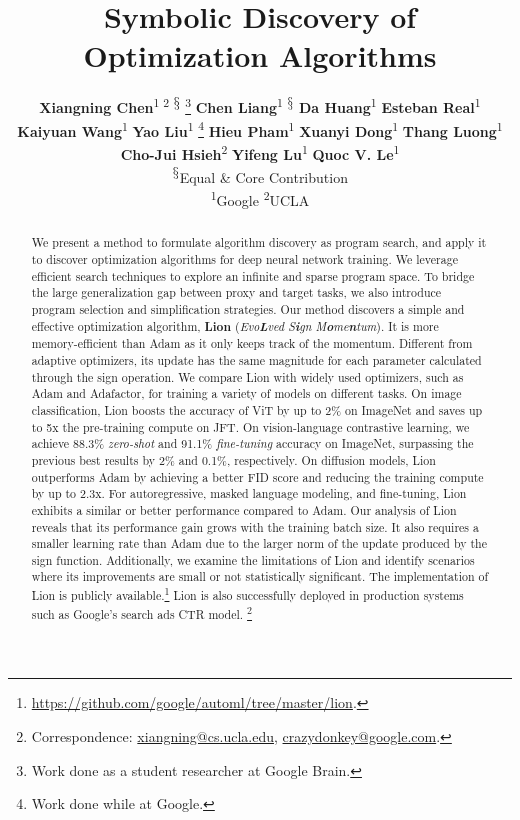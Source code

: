 \documentclass{article}
\title{
\vspace{-25pt}
\textbf{Symbolic Discovery of Optimization Algorithms}
  }
\author{
\normalsize{}
\textbf{Xiangning Chen}\textsuperscript{1 2 $\mathsection$ }\thanks{Work done as a student researcher at Google Brain.}\hspace{8mm}
\textbf{Chen Liang}\textsuperscript{1 $\mathsection$}\hspace{8mm}
\textbf{Da Huang}\textsuperscript{1}\hspace{8mm}
\textbf{Esteban Real}\textsuperscript{1}
\vspace{10pt}
\\
\normalsize{}
\textbf{Kaiyuan Wang}\textsuperscript{1}\hspace{8mm}
\textbf{Yao Liu}\textsuperscript{1 }\thanks{Work done while at Google.}\hspace{8mm}
\textbf{Hieu Pham}\textsuperscript{1}\hspace{8mm}
\textbf{Xuanyi Dong}\textsuperscript{1}\hspace{8mm}
\textbf{Thang Luong}\textsuperscript{1}
\vspace{10pt}
 \\ 
\normalsize{}
\textbf{Cho-Jui Hsieh}\textsuperscript{2}\hspace{8mm}
\textbf{Yifeng Lu}\textsuperscript{1}\hspace{8mm}
\textbf{Quoc V. Le}\textsuperscript{1}
\vspace{20pt}
\\ 
\normalsize{}
\textsuperscript{$\mathsection$}Equal \& Core Contribution
\vspace{20pt}
\\ 
\normalsize{}
\textsuperscript{1}Google\hspace{20mm}
\textsuperscript{2}UCLA
}
\date{}
\newcommand{\name}{Lion}
\newcommand\blfootnote[1]{%
  \begingroup
  \renewcommand\thefootnote{}\footnote{#1}%
  \addtocounter{footnote}{-1}%
  \endgroup
}
\begin{document}
\doparttoc %
\faketableofcontents %

\maketitle


\begin{abstract}
\noindent
We present a method to formulate algorithm discovery as program search, and apply it to discover optimization algorithms for deep neural network training. We leverage efficient search techniques to explore an infinite and sparse program space. To bridge the large generalization gap between proxy and target tasks, we also introduce program selection and simplification strategies.
Our method discovers a simple and effective optimization algorithm, \textbf{\name{}} (\textit{Evo\textbf{L}ved S\textbf{i}gn M\textbf{o}me\textbf{n}tum}). It is more memory-efficient than Adam as it only keeps track of the momentum. Different from adaptive optimizers, its update has the same magnitude for each parameter calculated through the sign operation.
We compare \name{} with widely used optimizers, such as Adam and Adafactor, for training a variety of models on different tasks. On image classification, \name{} boosts the accuracy of ViT by up to 2\% on ImageNet and saves up to 5x the pre-training compute on JFT. On vision-language contrastive learning, we achieve 88.3\% \textit{zero-shot} and 91.1\% \textit{fine-tuning} accuracy on ImageNet, surpassing the previous best results by 2\% and 0.1\%, respectively. On diffusion models, \name{} outperforms Adam by achieving a better FID score and reducing the training compute by up to 2.3x. For autoregressive, masked language modeling, and fine-tuning, \name{} exhibits a similar or better performance compared to Adam. Our analysis of \name{} reveals that its performance gain grows with the training batch size. It also requires a smaller learning rate than Adam due to the larger norm of the update produced by the sign function. Additionally, we examine the limitations of \name{} and identify scenarios where its improvements are small or not statistically significant. The implementation of \name{} is publicly available.\footnote{\url{https://github.com/google/automl/tree/master/lion}.}
\name{} is also successfully deployed in production systems such as Google’s search ads CTR model.
\blfootnote{Correspondence: \href{xiangning@cs.ucla.edu}{xiangning@cs.ucla.edu}, \href{crazydonkey@google.com}{crazydonkey@google.com}.}



\end{abstract}
\end{document}
